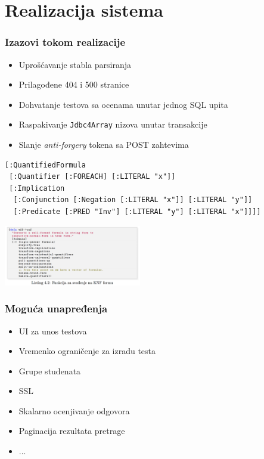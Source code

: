 \documentclass[compress,12pt,hyperref=unicode]{beamer}
\begin{document}
\section{Realizacija sistema}
\begin{frame}[fragile]
\frametitle{Izazovi tokom realizacije}
\begin{itemize}
\item Uprošćavanje stabla parsiranja
\item Prilagođene 404 i 500 stranice
\item Dohvatanje testova sa ocenama unutar jednog SQL upita
\item Raspakivanje \texttt{Jdbc4Array} nizova unutar transakcije
\item Slanje \textit{anti-forgery} tokena sa POST zahtevima
\end{itemize}
\centering
\begin{Verbatim}[framesep=2mm,labelposition=bottomline,frame=single,label=Primer stabla parsiranja,fontsize=\tiny]
[:QuantifiedFormula
 [:Quantifier [:FOREACH] [:LITERAL "x"]]
 [:Implication
  [:Conjunction [:Negation [:LITERAL "x"]] [:LITERAL "y"]]
  [:Predicate [:PRED "Inv"] [:LITERAL "y"] [:LITERAL "x"]]]]
\end{Verbatim}
\begin{center}
\includegraphics[width=0.45\textwidth]{wff-screenshot}
\end{center}
\end{frame}

\begin{frame}
\frametitle{Moguća unapređenja}
\begin{itemize}
\item UI za unos testova
\item Vremenko ograničenje za izradu testa
\item Grupe studenata
\item SSL
\item Skalarno ocenjivanje odgovora
\item Paginacija rezultata pretrage
\item ...
\end{itemize}
\end{frame}
\end{document}
